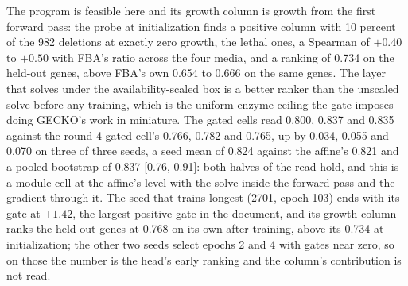 




The program is feasible here and its growth column is growth from the first forward
pass: the probe at initialization finds a positive column with 10 percent of the 982
deletions at exactly zero growth, the lethal ones, a Spearman of $+0.40$ to $+0.50$ with
FBA's ratio across the four media, and a ranking of 0.734 on the held-out genes, above
FBA's own 0.654 to 0.666 on the same genes. The layer that solves under the
availability-scaled box is a better ranker than the unscaled solve before any
training, which is the uniform enzyme ceiling the gate imposes doing GECKO's work in
miniature. The gated cells read 0.800, 0.837 and 0.835 against the round-4 gated cell's
0.766, 0.782 and 0.765, up by 0.034, 0.055 and 0.070 on three of three seeds, a seed
mean of 0.824 against the affine's 0.821 and a pooled bootstrap of 0.837 [0.76, 0.91]:
both halves of the read hold, and this is a module cell at the affine's level with the
solve inside the forward pass and the gradient through it. The seed that trains longest
(2701, epoch 103) ends with its gate at $+1.42$, the largest positive gate in the
document, and its growth column ranks the held-out genes at 0.768 on its own after
training, above its 0.734 at initialization; the other two seeds select epochs 2 and 4
with gates near zero, so on those the number is the head's early ranking and the
column's contribution is not read.

